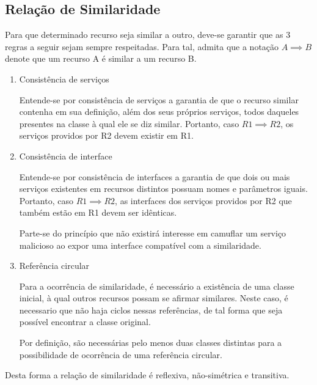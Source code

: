 \subsection{Relação de Similaridade}

Para que determinado recurso seja similar a outro, deve-se garantir que as 3 regras a seguir sejam sempre respeitadas. Para tal, admita que a notação $A \implies B$ denote que um recurso A é similar a um recurso B.

\begin{enumerate}
	\item Consistência de serviços

		Entende-se por consistência de serviços a garantia de que o recurso similar contenha em sua definição, além dos seus próprios serviços, todos daqueles presentes na classe à qual ele se diz similar. Portanto, caso $R1 \implies R2$, os serviços providos por R2 devem existir em R1.
	\item Consistência de interface

		Entende-se por consistência de interfaces a garantia de que dois ou mais serviços existentes em recursos distintos possuam nomes e parâmetros iguais. Portanto, caso $R1 \implies R2$, as interfaces dos serviços providos por R2 que também estão em R1 devem ser idênticas.

		Parte-se do princípio que não existirá interesse em camuflar um serviço malicioso ao expor uma interface compatível com a similaridade.
	\item Referência circular

		Para a ocorrência de similaridade, é necessário a existência de uma classe inicial, à qual outros recursos possam se afirmar similares. Neste caso, é necessario que não haja ciclos nessas referências, de tal forma que seja possível encontrar a classe original.

		Por definição, são necessárias pelo menos duas classes distintas para a possibilidade de ocorrência de uma referência circular.
\end{enumerate}

Desta forma a relação de similaridade é reflexiva, não-simétrica e transitiva.

